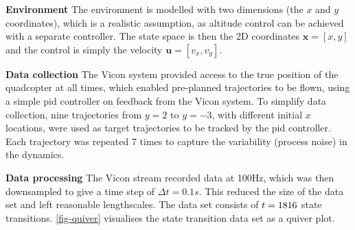 \documentclass{mimosis-class/mimosis}
\numberwithin{equation}{chapter}
\newcommand{\numData}{\ensuremath{t}}
\newcommand{\NumData}{\ensuremath{\MakeUppercase{\numData}}}
\newcommand{\state}{\ensuremath{\mathbf{x}}}
\newcommand{\control}{\ensuremath{\mathbf{u}}}
\begin{document}
{\textbf{Environment} The environment is modelled with two dimensions
(the \(x\) and \(y\) coordinates), which is a realistic assumption,
as altitude control can be achieved with a separate controller.
The state space is then the 2D coordinates \(\state = [x, y]\) and the control is simply the velocity
\(\control = [v_x, v_y]\).

\textbf{Data collection} The Vicon system provided access to the true position of the quadcopter at all times, which
enabled pre-planned trajectories to be flown, using a simple \acrshort{pid} controller on
feedback from the Vicon system.
To simplify data collection,
nine trajectories from \(y=2\) to \(y=-3\), with different initial \(x\) locations,
were used as target trajectories to be tracked by the \acrshort{pid} controller.
Each trajectory was repeated 7 times to capture the variability (process noise) in the dynamics.

\textbf{Data processing} The Vicon stream recorded data at 100Hz, which was then downsampled to
give a time step of \(\Delta t = 0.1s\).
This reduced the size of the data set and left reasonable lengthscales.
The data set consists of \(\NumData=1816\) state transitions.
\cref{fig-quiver} visualises the state transition data set as a quiver plot.

}
\end{document}

